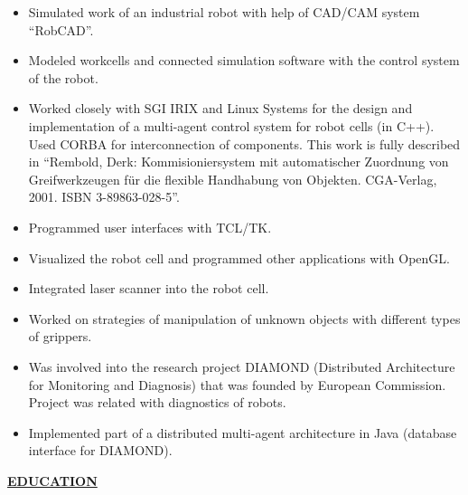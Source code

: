 \documentclass[a4paper,12pt,]{article}
\begin{document}
\begin{description}
    \begin{itemize}
      
    \item Simulated work of an industrial robot with help of CAD/CAM system ``RobCAD''.

    \item Modeled workcells and connected simulation software with the control system of the robot.

    \item Worked closely with SGI IRIX and Linux Systems for the design and implementation 
      of a multi-agent control system for robot cells (in C++). 
      Used CORBA for interconnection of components. This work is fully described
      in ``Rembold, Derk: Kommisioniersystem mit automatischer Zuordnung von Greifwerkzeugen
      f\"{u}r die flexible Handhabung von Objekten. CGA-Verlag, 2001. ISBN 3-89863-028-5''.

    \item Programmed user interfaces with TCL/TK.

    \item Visualized the robot cell and programmed other applications with OpenGL.

    \item Integrated laser scanner into the robot cell.

    \item Worked on strategies of manipulation of unknown objects with different types
      of grippers.

    \item Was involved into the research project DIAMOND (Distributed Architecture for 
      Monitoring and Diagnosis) that was
      founded by European Commission. Project was related with diagnostics of robots.

    \item Implemented part of a distributed multi-agent architecture in Java (database 
      interface for DIAMOND).

    \end{itemize}

  \end{description}

  \newpage

  \uline{ \bfseries{EDUCATION} }
\end{document}
